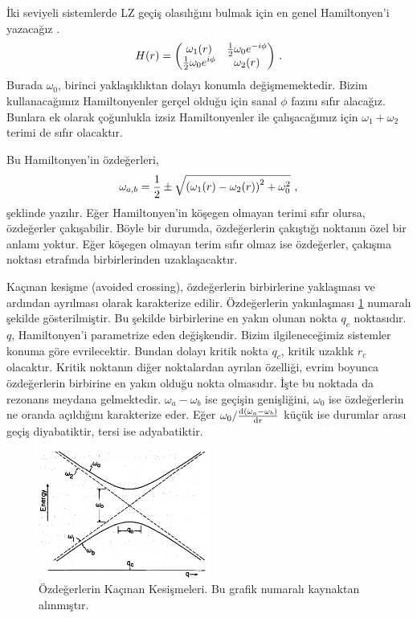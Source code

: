 İki seviyeli sistemlerde LZ geçiş olasılığını bulmak için en genel Hamiltonyen'i yazacağız \cite{1981PhRvA..23.3107R}.
\begin{equation}
	H(r) = \mqty(\omega_{1}(r) & \frac{1}{2} \omega_{0} e^{-i\phi}\\ \frac{1}{2} \omega_{0} e^{i\phi} & \omega_{2}(r) ) \text{ .}
\end{equation}
Burada $ \omega_{0} $, birinci yaklaşıklıktan dolayı konumla değişmemektedir. Bizim kullanacağımız Hamiltonyenler gerçel olduğu için sanal $ \phi $ fazını sıfır alacağız. Bunlara ek olarak çoğunlukla izsiz Hamiltonyenler ile çalışacağımız için $ \omega_{1}+\omega_{2} $ terimi de sıfır olacaktır. 

Bu Hamiltonyen'in özdeğerleri, 
\begin{equation}
	\omega_{a,b} = \frac{1}{2} \pm \sqrt{\qty(\omega_{1}(r)-\omega_{2}(r))^{2}+ \omega_{0}^{2}} \text{ ,}
\end{equation}
şeklinde yazılır. Eğer Hamiltonyen'in köşegen olmayan terimi sıfır olursa, özdeğerler çakışabilir. Böyle bir durumda, özdeğerlerin çakıştığı noktanın özel bir anlamı yoktur. Eğer köşegen olmayan terim sıfır olmaz ise özdeğerler, çakışma noktası etrafında birbirlerinden uzaklaşacaktır.

Kaçınan kesişme (avoided crossing), özdeğerlerin birbirlerine yaklaşması ve ardından ayrılması olarak karakterize edilir. Özdeğerlerin yakınlaşması \ref{fig:avoidCrossing} numaralı şekilde gösterilmiştir. Bu şekilde birbirlerine en yakın olunan nokta $ q_{c} $ noktasıdır. $ q $, Hamiltonyen'i parametrize eden değişkendir. Bizim ilgileneceğimiz sistemler konuma göre evrilecektir. Bundan dolayı kritik nokta $ q_{c} $, kritik uzaklık $ r_{c} $ olacaktır. Kritik noktanın diğer noktalardan ayrılan özelliği, evrim boyunca özdeğerlerin birbirine en yakın olduğu nokta olmasıdır. İşte bu noktada da rezonans meydana gelmektedir. $ \omega_{a}-\omega_{b} $ ise geçişin genişliğini, $ \omega_{0} $ ise özdeğerlerin ne oranda açıldığını karakterize eder. Eğer $ \omega_{0}/\dv{(\omega_{a}-\omega_{b})}{r} $ küçük ise durumlar arası geçiş diyabatiktir, tersi ise adyabatiktir.
\begin{figure}[hbt!]
	\centering
	\includegraphics[width=0.5\textwidth]{figures/Avoid_Crossing_With_Paramters.png}
	\caption[Özdeğerlerin Kaçınan Kesişmeleri]{Özdeğerlerin Kaçınan Kesişmeleri. Bu grafik \cite{1981PhRvA..23.3107R} numaralı kaynaktan alınmıştır.}
	\label{fig:avoidCrossing}
\end{figure}

